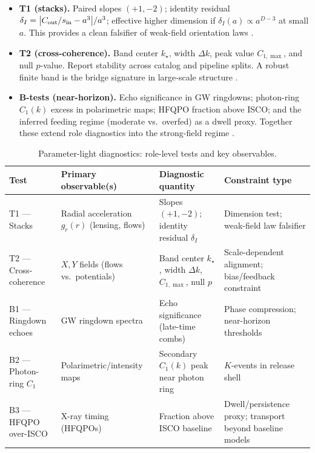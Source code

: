\documentclass[12pt,a4paper,oneside]{scrreprt}
\begin{document}
\begin{itemize}
  \item \textbf{T1 (stacks).} Paired slopes $(+1,-2)$; identity residual 
  $\delta_I = \big|C_{\rm out}/s_{\rm in} - a^3\big|/a^3$; 
  effective higher dimension if $\delta_I(a) \propto a^{D-3}$ at small $a$. 
  This provides a clean falsifier of weak-field orientation laws 
  \citep{Sheldon2004WeakLensing,Clampitt2015Voids}.
  
  \item \textbf{T2 (cross-coherence).} Band center $k_\star$, width $\Delta k$, 
  peak value $C_{1,\max}$, and null $p$-value. 
  Report stability across catalog and pipeline splits. 
  A robust finite band is the bridge signature in large-scale structure 
  \citep{Dekel1999LSS,Planck2018Cosmo}.
  
  \item \textbf{B-tests (near-horizon).} Echo significance in GW ringdowns; 
  photon-ring $C_1(k)$ excess in polarimetric maps; 
  HFQPO fraction above ISCO; 
  and the inferred feeding regime (moderate vs.\ overfed) as a dwell proxy. 
  Together these extend role diagnostics into the strong-field regime 
  \citep{Abedi2017Echoes,EventHorizonTelescope2022Science}.
\end{itemize}

\begin{table}[h]
\centering
\caption{Parameter-light diagnostics: role-level tests and key observables.}
\begin{tabular}{p{2.5cm} p{4cm} p{4cm} p{3.5cm}}
\toprule
\textbf{Test} & \textbf{Primary observable(s)} & \textbf{Diagnostic quantity} & \textbf{Constraint type} \\
\midrule
T1 — Stacks & Radial acceleration $g_r(r)$ (lensing, flows) & Slopes $(+1,-2)$; identity residual $\delta_I$ & Dimension test; weak-field law falsifier \\
\addlinespace
T2 — Cross-coherence & $X,Y$ fields (flows vs.\ potentials) & Band center $k_\star$, width $\Delta k$, $C_{1,\max}$, null $p$ & Scale-dependent alignment; bias/feedback constraint \\
\addlinespace
B1 — Ringdown echoes & GW ringdown spectra & Echo significance (late-time combs) & Phase compression; near-horizon thresholds \\
\addlinespace
B2 — Photon-ring $C_1$ & Polarimetric/intensity maps & Secondary $C_1(k)$ peak near photon ring & $K$-events in release shell \\
\addlinespace
B3 — HFQPO over-ISCO & X-ray timing (HFQPOs) & Fraction above ISCO baseline & Dwell/persistence proxy; transport beyond baseline models \\
\bottomrule
\end{tabular}
\end{table}
\end{document}
